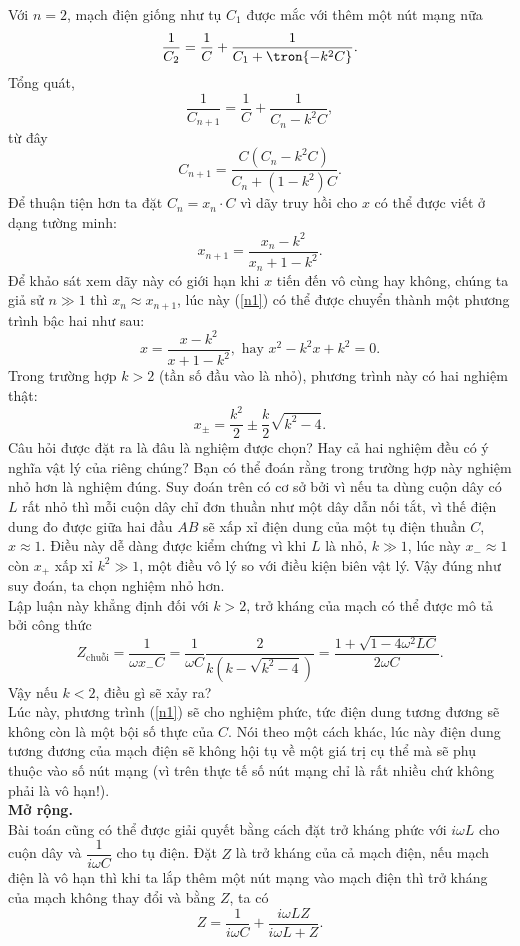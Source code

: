 \begin{loigiai}
Với $n=2$, mạch điện giống như tụ $C_1$ được mắc với thêm một nút mạng nữa
$$\dfrac{1}{C_2}=\dfrac{1}{C}+\dfrac{1}{C_1+\tron{-k^2 C}}.$$
Tổng quát,
$$\dfrac{1}{C_{n+1}}=\dfrac{1}{C}+\dfrac{1}{C_{n}-k^{2} C},$$
từ đây
$$C_{n+1}=\dfrac{C\left(C_{n}-k^{2} C\right)}{C_{n}+\left(1-k^{2}\right) C}.$$
Để thuận tiện hơn ta đặt $C_n=x_n\cdot C$ vì dãy truy hồi cho $x$ có thể được viết ở dạng tường minh:
\[x_{n+1}=\dfrac{x_n-k^2}{x_n +1 -k^2}.\tag{1} \label{n1}\]
Để khảo sát xem dãy này có giới hạn khi $x$ tiến đến vô cùng hay không, chúng ta giả sử $n\gg 1$ thì $x_n\approx x_{n+1}$, lúc này (\ref{n1}) có thể được chuyển thành một phương trình bậc hai như sau:
$$x=\dfrac{x-k^2}{x+1-k^2}, \text{ hay } x^2-k^2x+k^2=0.$$
Trong trường hợp $k>2$ (tần số đầu vào là nhỏ), phương trình này có hai nghiệm thật:
\[x_{\pm}=\dfrac{k^{2}}{2} \pm \dfrac{k}{2} \sqrt{k^{2}-4}\tag{2}.\label{n2}\]
Câu hỏi được đặt ra là đâu là nghiệm được chọn? Hay cả hai nghiệm đều có ý nghĩa vật lý của riêng chúng? Bạn có thể đoán rằng trong trường hợp này nghiệm nhỏ hơn là nghiệm đúng. Suy đoán trên có cơ sở bởi vì nếu ta dùng cuộn dây có $L$ rất nhỏ thì mỗi cuộn dây chỉ đơn thuần như một dây dẫn nối tắt, vì thế điện dung đo được giữa hai đầu $A B$ sẽ xấp xỉ điện dung của một tụ điện thuần $C$, $x\approx1$. Điều này dễ dàng được kiểm chứng vì khi $L$ là nhỏ, $k\gg 1$, lúc này $x_{-}\approx1$ còn $x_+$ xấp xỉ $k^2 \gg 1$, một điều vô lý so với điều kiện biên vật lý. Vậy đúng như suy đoán, ta chọn nghiệm nhỏ hơn.\\
Lập luận này khẳng định đối với $k>2$, trở kháng của mạch có thể được mô tả bởi công thức 
$$Z_{\text{chuỗi}}=\dfrac{1}{\omega x_{-} C}=\dfrac{1}{\omega C} \dfrac{2}{k\left(k-\sqrt{k^{2}-4}\right)}=\dfrac{1+\sqrt{1-4 \omega^{2} L C}}{2 \omega C}.$$
Vậy nếu $k<2$, điều gì sẽ xảy ra?\\
Lúc này, phương trình (\ref{n1}) sẽ cho nghiệm phức, tức điện dung tương đương sẽ không còn là một bội số thực của $C$. Nói theo một cách khác, lúc này điện dung tương đương của mạch điện sẽ không hội tụ về một giá trị cụ thể mà sẽ phụ thuộc vào số nút mạng (vì trên thực tế số nút mạng chỉ là rất nhiều chứ không phải là vô hạn!).\\
\textbf{Mở rộng.}\\
Bài toán cũng có thể được giải quyết bằng cách đặt trở kháng phức với $i\omega L$ cho cuộn dây và $\dfrac{1}{i\omega C}$ cho tụ điện. Đặt $Z$ là trở kháng của cả mạch điện, nếu mạch điện là vô hạn thì khi ta lắp thêm một nút mạng vào mạch điện thì trở kháng của mạch không thay đổi và bằng $Z$, ta có
$$Z=\dfrac{1}{i\omega C}+\dfrac{i\omega LZ}{i\omega L +Z}.$$

\end{loigiai}
